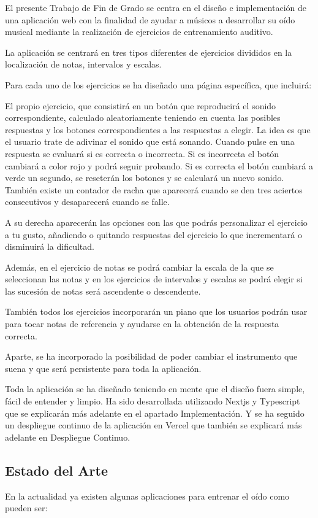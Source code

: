 \documentclass[12pt,twoside,titlepage]{report}
\begin{document}
El presente Trabajo de Fin de Grado se centra en el diseño e implementación de una aplicación web con la finalidad de ayudar a músicos a desarrollar su oído musical mediante la realización de ejercicios de entrenamiento auditivo. 

La aplicación se centrará en tres tipos diferentes de ejercicios divididos en la localización de notas, intervalos y escalas. 

Para cada uno de los ejercicios se ha diseñado una página específica, que incluirá:

El propio ejercicio, que consistirá en un botón que reproducirá el sonido correspondiente, calculado aleatoriamente teniendo en cuenta las posibles respuestas y los botones correspondientes a las respuestas a elegir. La idea es que el usuario trate de adivinar el sonido que está sonando. Cuando pulse en una respuesta se evaluará si es correcta o incorrecta. Si es incorrecta el botón cambiará a color rojo y podrá seguir probando. Si es correcta el botón cambiará a verde un segundo, se reseterán los botones y se calculará un nuevo sonido. También existe un contador de racha que aparecerá cuando se den tres aciertos consecutivos y desaparecerá cuando se falle.

A su derecha aparecerán las opciones con las que podrás personalizar el ejercicio a tu gusto, añadiendo o quitando respuestas del ejercicio lo que incrementará o disminuirá la dificultad. 

Además, en el ejercicio de notas se podrá cambiar la escala de la que se seleccionan las notas y en los ejercicios de intervalos y escalas se podrá elegir si las sucesión de notas será ascendente o descendente. 

También todos los ejercicios incorporarán un piano que los usuarios podrán usar para tocar notas de referencia y ayudarse en la obtención de la respuesta correcta. 

Aparte, se ha incorporado la posibilidad de poder cambiar el instrumento que suena y que será persistente para toda la aplicación.

Toda la aplicación se ha diseñado teniendo en mente que el diseño fuera simple, fácil de entender y limpio. Ha sido desarrollada utilizando Nextjs y Typescript que se explicarán más adelante en el apartado Implementación. Y se ha seguido un despliegue continuo de la aplicación en Vercel que también se explicará más adelante en Despliegue Continuo.

\subsection{Estado del Arte}
En la actualidad ya existen algunas aplicaciones para entrenar el oído como pueden ser:
\end{document}
